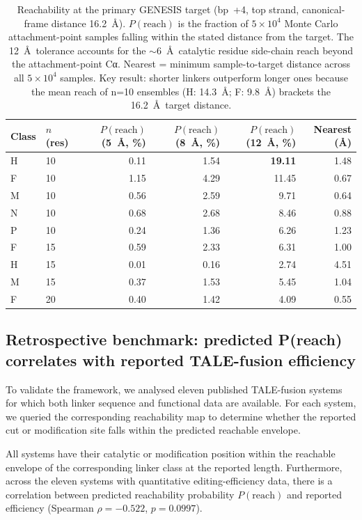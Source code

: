 \documentclass[11pt,a4paper]{article}
\newcommand{\preach}{P(\mathrm{reach})}
\begin{document}
\begin{table}[H]
\centering
\caption{Reachability at the primary GENESIS target (bp~+4, top strand, canonical-frame
distance 16.2~\AA). $\preach$ is the fraction of $5\times10^4$ Monte Carlo attachment-point
samples falling within the stated distance from the target. The 12~\AA\ tolerance accounts
for the $\sim$6~\AA\ catalytic residue side-chain reach beyond the attachment-point Cα.
Nearest = minimum sample-to-target distance across all $5\times10^4$ samples.
Key result: shorter linkers outperform longer ones because the mean reach of n=10 ensembles
(H: 14.3~\AA; F: 9.8~\AA) brackets the 16.2~\AA\ target distance.}
\label{tab:reach_genesis}
\begin{tabular}{llrrrr}
\toprule
Class & $n$ (res) & $\preach$ (5~\AA, \%) & $\preach$ (8~\AA, \%) & $\preach$ (12~\AA, \%) & Nearest (\AA) \\
\midrule
H & 10 & 0.11 & 1.54 & \textbf{19.11} & 1.48 \\
F & 10 & 1.15 & 4.29 & 11.45 & 0.67 \\
M & 10 & 0.56 & 2.59 &  9.71 & 0.64 \\
N & 10 & 0.68 & 2.68 &  8.46 & 0.88 \\
P & 10 & 0.24 & 1.36 &  6.26 & 1.23 \\
F & 15 & 0.59 & 2.33 &  6.31 & 1.00 \\
H & 15 & 0.01 & 0.16 &  2.74 & 4.51 \\
M & 15 & 0.37 & 1.53 &  5.45 & 1.04 \\
F & 20 & 0.40 & 1.42 &  4.09 & 0.55 \\
\bottomrule
\end{tabular}
\end{table}

\subsection{Retrospective benchmark: predicted P(reach) correlates with reported TALE-fusion efficiency}
\label{subsec:benchmark}

To validate the framework, we analysed eleven published TALE-fusion systems for which
both linker sequence and functional data are available. For each system, we queried
the corresponding reachability map to determine whether the reported cut or modification
site falls within the predicted reachable envelope.

All systems have their catalytic or modification position within the reachable
envelope of the corresponding linker class at the reported length. Furthermore, across
the eleven systems with quantitative editing-efficiency data, there is a correlation
between predicted reachability probability $P(\mathrm{reach})$ and reported efficiency
(Spearman $\rho = -0.522$, $p = 0.0997$).
\end{document}
